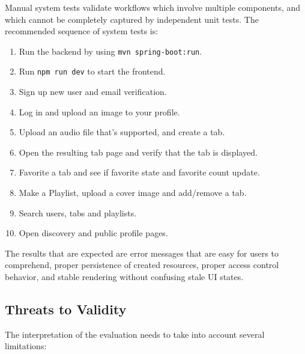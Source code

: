 \documentclass[a4paper, 12pt, titlepage]{article}
\begin{document}
Manual system tests validate workflows which involve multiple components, and which cannot be completely captured by independent unit tests. The recommended sequence of system tests is:

\begin{enumerate}
    \item Run the backend by using \texttt{mvn spring-boot:run}.
    \item Run \texttt{npm run dev} to start the frontend.
    \item Sign up new user and email verification.
    \item Log in and upload an image to your profile.
    \item Upload an audio file that's supported, and create a tab.
    \item Open the resulting tab page and verify that the tab is displayed.
    \item Favorite a tab and see if favorite state and favorite count update.
    \item Make a Playlist, upload a cover image and add/remove a tab.
    \item Search users, tabs and playlists.
    \item Open discovery and public profile pages.
\end{enumerate}

The results that are expected are error messages that are easy for users to comprehend, proper persistence of created resources, proper access control behavior, and stable rendering without confusing stale UI states.

\subsection{Threats to Validity}

The interpretation of the evaluation needs to take into account several limitations:
\end{document}
